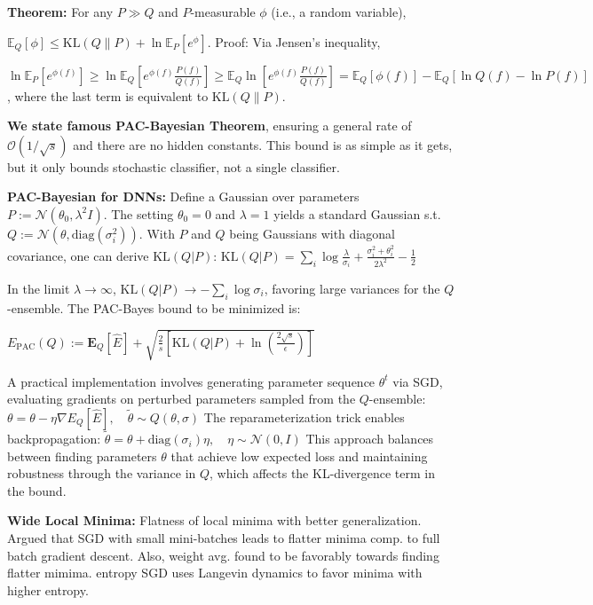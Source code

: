\textbf{Theorem:} For any \( P \gg Q \) and \( P \)-measurable \( \phi \) (i.e., a random variable),

$\mathbb{E}_Q[\phi] \leq \text{KL}(Q \| P) + \ln \mathbb{E}_P \left[ e^\phi \right]$. Proof: Via Jensen’s inequality,

$\ln \mathbb{E}_P \left[ e^{\phi(f)} \right] 
\geq \ln \mathbb{E}_Q \left[ e^{\phi(f)} \frac{P(f)}{Q(f)} \right] 
\geq \mathbb{E}_Q \ln \left[ e^{\phi(f)} \frac{P(f)}{Q(f)} \right] = \mathbb{E}_Q[\phi(f)] - \mathbb{E}_Q \left[ \ln Q(f) - \ln P(f) \right]$, where the last term is equivalent to $\text{KL}(Q \| P).$

\textbf{We state famous PAC-Bayesian Theorem}, ensuring a general rate of $\mathcal{O}(1/\sqrt{s})$ and there are no hidden constants. This bound is
 as simple as it gets, but it only bounds stochastic classifier, not a single classifier.

\textbf{PAC-Bayesian for DNNs:}
Define a Gaussian over parameters $P := \mathcal{N}(\theta_0, \lambda^2 I)$. The setting $\theta_0=0$ and $\lambda=1$ yields a standard Gaussian s.t. $Q := \mathcal{N}(\theta, \text{diag}(\sigma^2_i))$. With $P$ and $Q$ being Gaussians with diagonal covariance, one can derive $\text{KL}(Q | P)$:
$\text{KL}(Q | P) = \sum_i \log \frac{\lambda}{\sigma_i} + \frac{\sigma_i^2 + \theta_i^2}{2\lambda^2} - \frac{1}{2}$

In the limit $\lambda \to \infty$, $\text{KL}(Q | P) \to -\sum_i \log \sigma_i$, favoring large variances for the $Q$-ensemble. The PAC-Bayes bound to be minimized is:

$E_{\text{PAC}}(Q) := \mathbf{E}_Q[\hat{E}] + \sqrt{\frac{2}{s}\left[\text{KL}(Q | P) + \ln\left(\frac{2\sqrt{s}}{\epsilon}\right)\right]}$

A practical implementation involves generating parameter sequence $\theta^t$ via SGD, evaluating gradients on perturbed parameters sampled from the $Q$-ensemble:
$\theta = \theta - \eta \nabla E_Q[\hat{E}], \quad \tilde{\theta} \sim Q(\theta, \sigma)$
The reparameterization trick enables backpropagation:
$\tilde{\theta} = \theta + \text{diag}(\sigma_i)\eta, \quad \eta \sim \mathcal{N}(0, I)$
This approach balances between finding parameters $\theta$ that achieve low expected loss and maintaining robustness through the variance in $Q$, which affects the KL-divergence term in the bound.


\textbf{Wide Local Minima:} Flatness of local minima with better generalization.  \textrightarrow Argued that SGD with small mini-batches leads to flatter minima comp. to full batch gradient descent. Also, weight avg. found to be favorably towards finding flatter mimima. \textrightarrow entropy SGD uses Langevin dynamics to favor minima with higher entropy.
